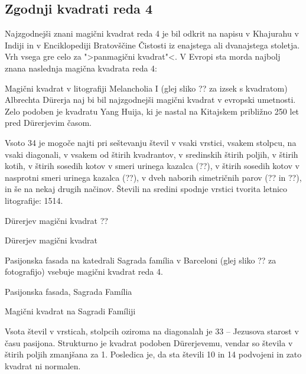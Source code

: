 \documentclass[a4paper,12pt]{article}
\theoremstyle{definition}
\theoremstyle{plain}
\begin{document}

\subsection{Zgodnji kvadrati reda 4}

Najzgodnejši znani magični kvadrat reda 4 je bil odkrit na napisu
v Khajurahu v Indiji in v Enciklopediji Bratovščine Čistosti iz enajstega
ali dvanajstega stoletja. Vrh vsega gre celo za ">panmagični kvadrat"<.
V Evropi sta morda najbolj znana naslednja magična kvadrata reda 4:

Magični kvadrat v litografiji Melancholia I (glej sliko ??
za izsek s kvadratom) Albrechta Dürerja naj bi bil najzgodnejši magični kvadrat
v evropski umetnosti. Zelo podoben je kvadratu Yang Huija, ki je nastal na Kitajskem
približno 250 let pred Dürerjevim časom.

Vsoto 34 je mogoče najti pri seštevanju števil v vsaki vrstici, vsakem stolpcu,
na vsaki diagonali, v vsakem od štirih kvadrantov, v sredinskih štirih poljih,
v štirih kotih, v štirih sosedih kotov v smeri urinega kazalca (??), v
štirih sosedih kotov v nasprotni smeri urinega kazalca (??), v dveh naborih
simetričnih parov (?? in ??), in še na nekaj drugih načinov.
Števili na sredini spodnje vrstici tvorita letnico litografije: 1514.

Dürerjev magični kvadrat ??

Dürerjev magični kvadrat

Pasijonska fasada na katedrali Sagrada família v Barceloni
(glej sliko ?? za fotografijo) vsebuje magični kvadrat reda 4.

Pasijonska fasada, Sagrada Família

Magični kvadrat na Sagradi Famíliji

Vsota števil v vrsticah, stolpcih oziroma na diagonalah je 33 -- Jezusova starost
v času pasijona. Strukturno je kvadrat podoben Dürerjevemu, vendar so števila
v štirih poljih zmanjšana za 1. Posledica je, da sta števili 10 in 14 podvojeni
in zato kvadrat ni normalen.
\end{document}
